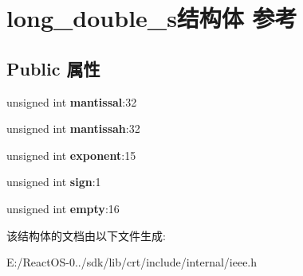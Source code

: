 \hypertarget{structlong__double__s}{}\section{long\+\_\+double\+\_\+s结构体 参考}
\label{structlong__double__s}
\subsection*{Public 属性}
\begin{DoxyCompactItemize}
\item 
\mbox{\label{structlong__double__s_acd48332f0fa53aab75670120e8ae33a0}} 
unsigned int {\bfseries mantissal}\+:32
\item 
\mbox{\label{structlong__double__s_ac0c8d44f4283dfae237162ece66e0882}} 
unsigned int {\bfseries mantissah}\+:32
\item 
\mbox{\label{structlong__double__s_ab295782b2f710ac812d1d64eff7e45c2}} 
unsigned int {\bfseries exponent}\+:15
\item 
\mbox{\label{structlong__double__s_ae28d0a0754a80ba6dd78d682adf026fa}} 
unsigned int {\bfseries sign}\+:1
\item 
\mbox{\label{structlong__double__s_aeb197a5db52f8492507feab585a3fec5}} 
unsigned int {\bfseries empty}\+:16
\end{DoxyCompactItemize}


该结构体的文档由以下文件生成\+:\begin{DoxyCompactItemize}
\item 
E\+:/\+React\+O\+S-\/0../sdk/lib/crt/include/internal/ieee.\+h\end{DoxyCompactItemize}
